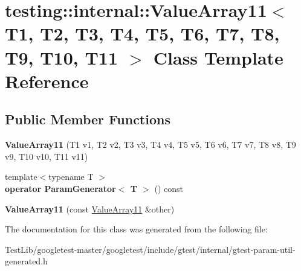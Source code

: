 \hypertarget{classtesting_1_1internal_1_1ValueArray11}{}\section{testing\+:\+:internal\+:\+:Value\+Array11$<$ T1, T2, T3, T4, T5, T6, T7, T8, T9, T10, T11 $>$ Class Template Reference}
\label{classtesting_1_1internal_1_1ValueArray11}
\subsection*{Public Member Functions}
\begin{DoxyCompactItemize}
\item 
\mbox{\label{classtesting_1_1internal_1_1ValueArray11_a2b26f49e7c5856e86f4fae360cd22d47}} 
{\bfseries Value\+Array11} (T1 v1, T2 v2, T3 v3, T4 v4, T5 v5, T6 v6, T7 v7, T8 v8, T9 v9, T10 v10, T11 v11)
\item 
\mbox{\label{classtesting_1_1internal_1_1ValueArray11_a3042498fcde8d1c91df474e618416f28}} 
{\footnotesize template$<$typename T $>$ }\\{\bfseries operator Param\+Generator$<$ T $>$} () const
\item 
\mbox{\label{classtesting_1_1internal_1_1ValueArray11_a09b4890b05313d04d98cbb5507d9b34e}} 
{\bfseries Value\+Array11} (const \hyperlink{classtesting_1_1internal_1_1ValueArray11}{Value\+Array11} \&other)
\end{DoxyCompactItemize}


The documentation for this class was generated from the following file\+:\begin{DoxyCompactItemize}
\item 
Test\+Lib/googletest-\/master/googletest/include/gtest/internal/gtest-\/param-\/util-\/generated.\+h\end{DoxyCompactItemize}
